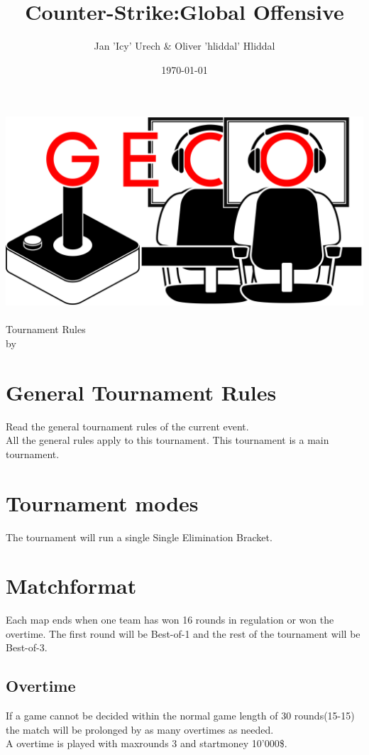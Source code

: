 \documentclass{article}
\title{Counter-Strike:Global Offensive}
\author{Jan 'Icy' Urech \& Oliver 'hliddal' Hliddal}
\date{\today}
\begin{document}
\makeatletter
\begin{titlepage}
\centering
\includegraphics[scale=0.075]{img/GECo.png}\\
\LARGE \@title\\ Tournament Rules\\ \normalsize by \@author\\ \@date
\end{titlepage}
\makeatother


\clearpage

\tableofcontents
\clearpage

\section{General Tournament Rules}
Read the general tournament rules of the current event.\\
All the general rules apply to this tournament. This tournament is a main tournament.

\section{Tournament modes}
The tournament will run a single Single Elimination Bracket.

\section{Matchformat}
Each map ends when one team has won 16 rounds in regulation or won the overtime.
The first round will be Best-of-1 and the rest of the tournament will be Best-of-3.

\subsection{Overtime}
If a game cannot be decided within the normal game length of 30 rounds(15-15) the match will be prolonged by as many overtimes as needed.\\
A overtime is played with maxrounds 3 and startmoney 10'000\$.
\end{document}
